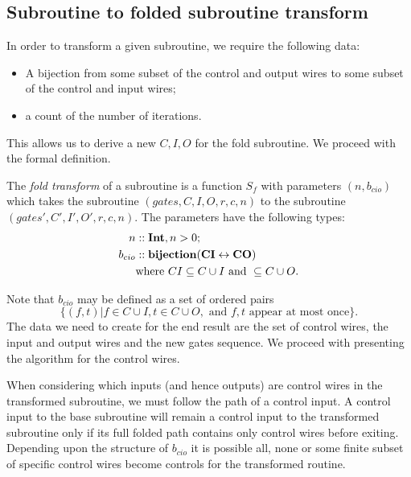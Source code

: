 
\subsection{Subroutine to folded subroutine transform} %
\label{sub:subroutine_to_folded_subroutine_transform}

In order to transform a given subroutine, we require the following data:
\begin{itemize}
  \item A bijection from some subset of the control and output wires to some subset of the control
    and input wires;
  \item a count of the number of iterations.
\end{itemize}

This allows us to derive a new $C,I,O$ for the fold subroutine. We proceed with the formal
definition.
\begin{definition}\label{def:fold_transform_of_a_subroutine}
  The \emph{fold transform} of a subroutine is a function $S_f$ with parameters $(n,b_{cio})$ which
  takes the subroutine $(gates,C,I,O,r,c,n)$ to the subroutine $(gates',C',I',O',r,c,n)$. The
  parameters have the following types:
  \begin{align*}
    n&::\mathbf{{Int}}, n>0;\\
    b_{cio}&::\mathbf{{bijection(CI \leftrightarrow CO)}} \\
    &\text{where }CI\subseteq C\cup I\text{ and }\subseteq C\cup O.
  \end{align*}
\end{definition}

Note that $b_{cio}$ may be defined as a set of ordered pairs
\begin{equation}
  \{(f,t)|f\in C\cup I, t \in C\cup O,\text{ and } f,t \text{ appear at most once}\}.
  \label{eq:defintion_of_bcio}
\end{equation}
The data we need to create for the end result are the set of control wires, the input and output
wires and the new gates sequence. We proceed with presenting the algorithm for the control wires.

When considering which inputs (and hence outputs) are control wires in the transformed subroutine,
we must follow the path of a control input. A control input to the base subroutine will remain a
control input to the transformed subroutine only if its full folded path contains only control
wires before exiting. Depending upon the structure of $b_{cio}$ it is possible all, none or some
finite subset of specific control wires become controls for the transformed routine.

